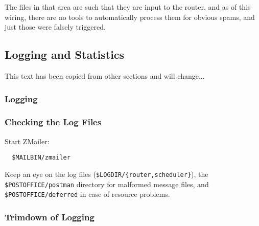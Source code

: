The files in that area are such that they are input to the router, and
as of this wiring, there are no tools to automatically process them for
obvious spams, and just those were falsely triggered.




\subsection{\label{Logging_and_Statistics}Logging and Statistics }

This text has been copied from other sections and will change...



\subsubsection{Logging}


\subsubsection{Checking the Log Files}

Start ZMailer:
\begin{verbatim}
  $MAILBIN/zmailer
\end{verbatim}


Keep an eye on the log files ({\tt \$LOGDIR/\{router,scheduler\}}),
the {\tt \$POSTOFFICE/postman} directory for malformed message files,
and {\tt \$POSTOFFICE/deferred} in case of resource problems.


\subsubsection{Trimdown of Logging}

